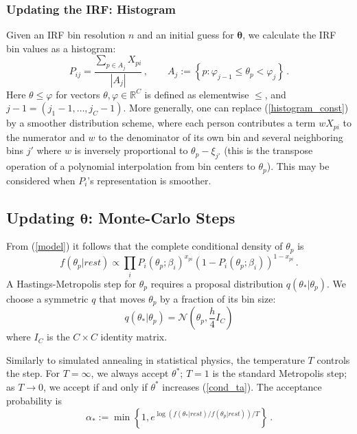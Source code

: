 \documentclass{article}
\newcommand{\bta}{\boldsymbol\ta}
\newcommand{\ta}{\theta}
\newcommand{\Normal}{\mathcal{N}}
\newcommand{\R}{\mathbb{R}}
\begin{document}
\subsubsection{Updating the IRF: Histogram}
\label{histogram}
Given an IRF bin resolution $n$ and an initial guess for $\bta$, we calculate the IRF bin values as a histogram:
\begin{equation}
	\label{histogram_const}
	P_{ij} = \frac{\sum_{p \in A_j} X_{pi}}{|A_j|}\,,\qquad
	A_j := \left\{ p : \varphi_{j-1} \leq \ta_p < \varphi_j \right\}\,.
\end{equation}
Here $\ta \leq \varphi$ for vectors $\ta,\varphi \in \R^C$ is defined as elementwise $\leq$, and $j-1 = (j_1-1,\dots,j_C-1)$.
More generally, one can replace (\ref{histogram_const}) by a smoother distribution scheme, where each person contributes a term $w X_{pi}$ to the numerator and $w$ to the denominator of its own bin and several neighboring bins $j'$ where $w$ is inversely proportional to $\ta_p - \xi_{j'}$ (this is the transpose operation of a polynomial interpolation from bin centers to $\ta_p$). This may be considered when $P_i$'s representation is smoother.

\subsection{Updating $\bta$: Monte-Carlo Steps}
\label{metropolis}
From (\ref{model}) it follows that the complete conditional density of $\ta_p$ is
\begin{equation}
  f(\ta_p|rest) \propto \prod_i 
  P_i(\ta_p;\beta_i)^{x_{pi}}\left(1 - P_i(\ta_p;\beta_i)\right)^{1-x_{pi}}\,.
  \label{cond_ta}
\end{equation}
A Hastings-Metropolis step for $\ta_p$ requires a proposal distribution $q(\ta_*|\ta_p)$. We choose a symmetric $q$ that moves $\ta_p$ by a fraction of its bin size:
\begin{equation}
	q(\ta_*|\ta_p) = \Normal(\ta_p, \frac{h}{4} I_C)
	\label{proposal}
\end{equation}
where $I_C$ is the $C \times C$ identity matrix.

Similarly to simulated annealing in statistical physics, the temperature $T$ controls the step. For $T = \infty$, we always accept $\ta^*$; $T = 1$ is the standard Metropolis step; as $T \rightarrow 0$, we accept if and only if $\ta^*$ increases (\ref{cond_ta}). The acceptance probability is
\begin{equation}
	\alpha_* := \min\left\{1, e^{\log(f(\ta_*|rest)/f(\ta_p|rest))/T} \right\}\,.
	\label{acceptable}
\end{equation}
\end{document}
